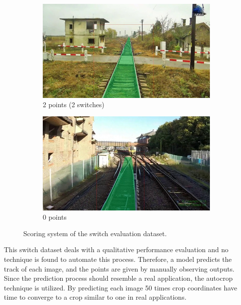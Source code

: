 \begin{figure}[H]
    \begin{subfigure}[b]{0.48\textwidth}
        \centering
        \includegraphics[width=\textwidth]{PICs/usedDatasets/2punkte.jpg}
        \caption{2 points (2 switches)}
    \end{subfigure}
    \hfill
    \begin{subfigure}[b]{0.48\textwidth}
        \centering
        \includegraphics[width=\textwidth]{PICs/usedDatasets/0punkte.jpg}
        \caption{0 points}
    \end{subfigure}
    \caption{Scoring system of the switch evaluation dataset.}
    \label{fig:pointSystem}
\end{figure}

This switch dataset deals with a qualitative performance evaluation and no technique is found to automate this process.
Therefore, a model predicts the track of each image, and the points are given by manually observing outputs.
Since the prediction process should resemble a real application, the autocrop technique is utilized.
By predicting each image 50 times crop coordinates have time to converge to a crop similar to one in real applications.

